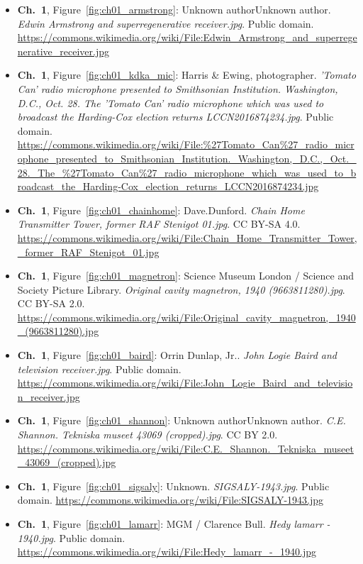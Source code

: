 \begin{small}
\begin{itemize}[leftmargin=0pt,itemsep=2pt,label={}]
\item \textbf{Ch.~1}, Figure~\ref{fig:ch01_armstrong}: Unknown authorUnknown author. \emph{Edwin Armstrong and superregenerative receiver.\allowbreak{}jpg}. Public domain. \url{https://commons.wikimedia.org/wiki/File:Edwin_Armstrong_and_superregenerative_receiver.jpg}
\item \textbf{Ch.~1}, Figure~\ref{fig:ch01_kdka_mic}: Harris \& Ewing, photographer. \emph{'Tomato Can' radio microphone presented to Smithsonian Institution.\allowbreak{} Washington, D.\allowbreak{}C.\allowbreak{}, Oct.\allowbreak{} 28.\allowbreak{} The 'Tomato Can' radio microphone which was used to broadcast the Harding-\allowbreak{}Cox election returns LCCN2016874234.\allowbreak{}jpg}. Public domain. \url{https://commons.wikimedia.org/wiki/File:%27Tomato_Can%27_radio_microphone_presented_to_Smithsonian_Institution._Washington,_D.C.,_Oct._28._The_%27Tomato_Can%27_radio_microphone_which_was_used_to_broadcast_the_Harding-Cox_election_returns_LCCN2016874234.jpg}
\item \textbf{Ch.~1}, Figure~\ref{fig:ch01_chainhome}: Dave.Dunford. \emph{Chain Home Transmitter Tower, former RAF Stenigot 01.\allowbreak{}jpg}. CC BY-SA 4.0. \url{https://commons.wikimedia.org/wiki/File:Chain_Home_Transmitter_Tower,_former_RAF_Stenigot_01.jpg}
\item \textbf{Ch.~1}, Figure~\ref{fig:ch01_magnetron}: Science Museum London / Science and Society Picture Library. \emph{Original cavity magnetron, 1940 (9663811280).\allowbreak{}jpg}. CC BY-SA 2.0. \url{https://commons.wikimedia.org/wiki/File:Original_cavity_magnetron,_1940_(9663811280).jpg}
\item \textbf{Ch.~1}, Figure~\ref{fig:ch01_baird}: Orrin Dunlap, Jr.. \emph{John Logie Baird and television receiver.\allowbreak{}jpg}. Public domain. \url{https://commons.wikimedia.org/wiki/File:John_Logie_Baird_and_television_receiver.jpg}
\item \textbf{Ch.~1}, Figure~\ref{fig:ch01_shannon}: Unknown authorUnknown author. \emph{C.\allowbreak{}E.\allowbreak{} Shannon.\allowbreak{} Tekniska museet 43069 (cropped).\allowbreak{}jpg}. CC BY 2.0. \url{https://commons.wikimedia.org/wiki/File:C.E._Shannon._Tekniska_museet_43069_(cropped).jpg}
\item \textbf{Ch.~1}, Figure~\ref{fig:ch01_sigsaly}: Unknown. \emph{SIGSALY-\allowbreak{}1943.\allowbreak{}jpg}. Public domain. \url{https://commons.wikimedia.org/wiki/File:SIGSALY-1943.jpg}
\item \textbf{Ch.~1}, Figure~\ref{fig:ch01_lamarr}: MGM / Clarence Bull. \emph{Hedy lamarr -\allowbreak{} 1940.\allowbreak{}jpg}. Public domain. \url{https://commons.wikimedia.org/wiki/File:Hedy_lamarr_-_1940.jpg}

\end{itemize}
\end{small}
